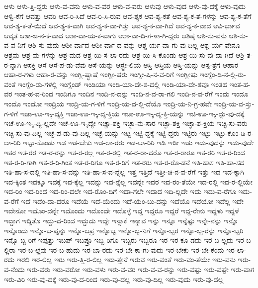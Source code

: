 {ಆಳು
ಆಳು-ತ್ತಿ-ದ್ದರು
ಆಳು-ವ-ವನು
ಆಳು-ವ-ವರ
ಆಳು-ವ-ವರು
ಆಳುವು
ಆಳು-ವುದ
ಆಳು-ವು-ದಕ್ಕೆ
ಆಳು-ವುದು
ಆಳ್ವಿ-ಕೆಗೆ
ಆವತ್ತು
ಆವರಿ
ಆವ-ರಿ-ಸಿದೆ
ಆವ-ರಿ-ಸಿ-ರುವ
ಆವ-ಶ್ಯಕ
ಆವ-ಶ್ಯ-ಕತೆ
ಆವ-ಶ್ಯ-ಕ-ತೆ-ಗಳನ್ನು
ಆವ-ಶ್ಯ-ಕ-ತೆಗೆ
ಆವ-ಶ್ಯ-ಕ-ತೆ-ಯಿದೆ
ಆವ-ಶ್ಯ-ಕ-ವಾಗಿ
ಆವ-ಶ್ಯ-ಕ-ವಾ-ಗಿತ್ತು
ಆವ-ಶ್ಯ-ಕ-ವಾ-ಗಿದೆ
ಆವ-ಶ್ಯ-ಕ-ವಾದ
ಆವಿ-ರ್ಭಾವ
ಆವೃತ
ಆಶಾ-ಜ-ನ-ಕ-ವಾದ
ಆಶಾ-ದಾ-ಯ-ಕ-ವಾಗು
ಆಶಾ-ವಾ-ದಿ-ಗ-ಳಾ-ಗಿ-ದ್ದರು
ಆಶಿಷ್ಠ
ಆಶಿ-ಸು-ವನು
ಆಶಿ-ಸು-ವ-ವ-ನಿಗೆ
ಆಶಿ-ಸು-ವುದು
ಆಶೀ-ರ್ವಾದ
ಆಶೀ-ರ್ವಾ-ದ-ವನ್ನು
ಆಶ್ಚ-ರ್ಯ-ವಾ-ಗು-ವು-ದಿಲ್ಲ
ಆಶ್ಚ-ರ್ಯ-ವೇನೂ
ಆಶ್ರಮ
ಆಶ್ರ-ಮ-ಗಳನ್ನು
ಆಶ್ರ-ಮದ
ಆಶ್ರ-ಯಿ-ಸ-ಲಾ-ರದು
ಆಶ್ರ-ಯಿ-ಸಿ-ಕೊಂಡು
ಆಶ್ರ-ಯಿ-ಸು-ವು-ದಾ-ಗಿದೆ
ಆಶ್ರಿ-ತ-ರ-ನ್ನಾಗಿ
ಆಸಕ್ತಿ
ಆಸೆ
ಆಸೆ-ಪ-ಡು-ವೆವು
ಆಸೆ-ಯನ್ನು
ಆಸ್ಟ್ರೇ-ಲಿಯ
ಆಸ್ತಿ
ಆಸ್ತಿಯ
ಆಸ್ತಿ-ಯನ್ನು
ಆಸ್ಪ-ತ್ರೆಗೆ
ಆಹಾರ
ಆಹಾ-ರ-ಗಳು
ಆಹಾ-ರ-ವನ್ನು
ಇಂಗ್ಲಿ-ಷ್ಭಾಷೆ
ಇಂಗ್ಲೀ-ಷರು
ಇಂಗ್ಲೀ-ಷಿ-ನ-ವ-ರಿಗೆ
ಇಂಗ್ಲೀಷು
ಇಂಗ್ಲೆಂ-ಡಿ-ನ-ಲ್ಲಿ-ರು-ವಂತೆ
ಇಂಗ್ಲೆಂ-ಡು-ಗಳಲ್ಲಿ
ಇಂಗ್ಲೆಂಡ್
ಇಂಡಿಯಾ
ಇಂಡಿ-ಯಾ-ದೇ-ಶ-ದಲ್ಲಿ
ಇಂಡಿ-ಯಾ-ದೇ-ಶವೂ
ಇಂತಹ
ಇಂತ-ಹ-ವರ
ಇಂತ-ಹ-ವ-ರಿಂದ
ಇಂದಿಗೂ
ಇಂದಿನ
ಇಂದಿ-ನ-ದನ್ನು
ಇಂದಿ-ನ-ವ-ರಾ-ಗಲಿ
ಇಂದಿ-ನ-ವ-ರೆಗೆ
ಇಂದು
ಇಂದೂ
ಇಂದೊ
ಇಂದೋ
ಇಂದ್ರಿಯ
ಇಂದ್ರಿ-ಯ-ಗ-ಳಿಗೆ
ಇಂದ್ರಿ-ಯ-ದ-ಲ್ಲಿ-ದೆಯೊ
ಇಂದ್ರಿ-ಯ-ನಿ-ಗ್ರ-ಹವೇ
ಇಂದ್ರಿ-ಯ-ವ-ಸ್ತು-ಗ-ಳಿಗೆ
ಇಚಾ-ಊ-ಇ-್ಕ-ದ್ಶಕ್ತಿ
ಇಚಾ-ಊ-ಇ-್ಕ-ದ್ಶ-ಕ್ತಿಯ
ಇಚಾ-ಊ-ಇ-್ಕ-ದ್ಶ-ಕ್ತಿ-ಯನ್ನು
ಇಚಿ-ಊ-ಇ-್ಕ-ದ್ಸು-ವು-ದಕ್ಕೆ
ಇಚೆ-ಊ-ಇ-್ಕ-ದ್ಯಿ-ಲ್ಲದೇ
ಇಚೆ-ಊ-ಇ-್ಕದ್ಯೇ
ಇಚ್ಚಾ-ಶಕ್ತಿ
ಇಚ್ಛಾ-ನು-ಸಾರ
ಇಚ್ಛಾ-ಶಕ್ತಿ
ಇಚ್ಛಾ-ಶ-ಕ್ತಿಯ
ಇಚ್ಛಿ-ಸು-ವರು
ಇಚ್ಛಿ-ಸು-ವು-ದಿಲ್ಲ
ಇಚ್ಛೆ-ಪ-ಡು-ವು-ದಿಲ್ಲ
ಇಚ್ಛೆ-ಯನ್ನು
ಇಟ್ಟ
ಇಟ್ಟಿ-ದ್ದಕ್ಕೆ
ಇಟ್ಟಿ-ದ್ದರು
ಇಟ್ಟಿರು
ಇಟ್ಟು
ಇಟ್ಟು-ಕೊಂ-ಡಿ-ರ-ಲಾ-ರಿರಿ
ಇಟ್ಟು-ಕೊಂಡು
ಇಡ
ಇಡ-ಬೇಕು
ಇಡ-ಲಾ-ರರು
ಇಡ-ಲಾ-ರಿರಿ
ಇಡಿ
ಇಡೀ
ಇಡು
ಇಡು-ವುದನ್ನು
ಇಡು-ವುದೇ
ಇತರ
ಇತ-ರರ
ಇತ-ರ-ರನ್ನು
ಇತ-ರ-ರಲ್ಲ
ಇತ-ರ-ರಲ್ಲಿ
ಇತ-ರ-ರಾ-ದರೊ
ಇತ-ರ-ರಾರೂ
ಇತ-ರರಿ
ಇತ-ರ-ರಿಂದ
ಇತ-ರ-ರಿ-ಗಾಗಿ
ಇತ-ರ-ರಿ-ಗಿಂತ
ಇತ-ರ-ರಿಗೂ
ಇತ-ರ-ರಿಗೆ
ಇತ-ರರು
ಇತ-ರ-ರೊ-ಡನೆ
ಇತಿ-ಹಾಸ
ಇತಿ-ಹಾ-ಸದ
ಇತಿ-ಹಾ-ಸ-ದಲ್ಲಿ
ಇತಿ-ಹಾ-ಸ-ವನ್ನು
ಇತಿ-ಹಾ-ಸ-ವ-ನ್ನೆಲ್ಲ
ಇತ್ತ
ಇತ್ತಿದೆ
ಇತ್ತೀ-ಚಿ-ನ-ವ-ರೆಗೆ
ಇತ್ತು
ಇದ
ಇದ-ಕ್ಕಾಗಿ
ಇದ-ಕ್ಕಿಂತ
ಇದಕ್ಕೂ
ಇದಕ್ಕೆ
ಇದ-ಕ್ಕೆಲ್ಲ
ಇದನ್ನು
ಇದ-ನ್ನೆಲ್ಲ
ಇದನ್ನೇ
ಇದರ
ಇದ-ರಂ-ತೆಯೇ
ಇದ-ರಲ್ಲಿ
ಇದ-ರ-ಲ್ಲಿಯೇ
ಇದ-ರಿಂ
ಇದ-ರಿಂದ
ಇದ-ರಿಂ-ದಲೇ
ಇದ-ರೊಂ-ದಿಗೆ
ಇದಾ-ಗಲೇ
ಇದಾದ
ಇದಿ-ಲ್ಲದೇ
ಇದು
ಇದು-ವ-ರೆಗೂ
ಇದು-ವ-ರೆಗೆ
ಇದೆ
ಇದೆಂ-ದಾ-ದರೂ
ಇದೆಯೆ
ಇದೆ-ಯೆಂದು
ಇದೆ-ಯೆಂ-ಬು-ದನ್ನು
ಇದೆಯೊ
ಇದೆಯೋ
ಇದೆಲ್ಲ
ಇದೇ
ಇದೇನೋ
ಇದೊಂ-ದನ್ನೇ
ಇದೊಂದು
ಇದೊಂದೇ
ಇದೊಳ್ಳೆ
ಇದ್ದ
ಇದ್ದರೂ
ಇದ್ದರೆ
ಇದ್ದ-ರೇನು
ಇದ್ದಳು
ಇದ್ದಳೆ
ಇದ್ದಾಗ
ಇದ್ದಿತೊ
ಇದ್ದು-ದ-ರಿಂದ
ಇದ್ದುದು
ಇದ್ದೇ
ಇನ್ನಾಕೆ
ಇನ್ನಾವ
ಇನ್ನು
ಇನ್ನೂ
ಇನ್ನೆಷ್ಟು
ಇನ್ನೇ-ನನ್ನು
ಇನ್ನೊ
ಇನ್ನೊಂದು
ಇನ್ನೊ-ಬ-ಪ್ನನ್ನು
ಇನ್ನೊ-ಬಪ್ರ
ಇನ್ನೊಬ್ಬ
ಇನ್ನೊ-ಬ್ಬ-ನಿಗೆ
ಇನ್ನೊ-ಬ್ಬರ
ಇನ್ನೊ-ಬ್ಬ-ರನ್ನು
ಇನ್ನೊ-ಬ್ಬರಿ
ಇನ್ನೊ-ಬ್ಬ-ರಿಗೆ
ಇಪ್ಪತ್ತು
ಇಬಪ್
ಇಬಪ್ರೂ
ಇಬ್ಬ-ರಿಗೂ
ಇಬ್ಬರು
ಇಬ್ಬರೂ
ಇರ
ಇರ-ಕೂ-ಡದು
ಇರ-ಬ-ಲ್ಲದು
ಇರ-ಬ-ಲ್ಲಿರಾ
ಇರ-ಬ-ಲ್ಲೆವು
ಇರ-ಬ-ಹುದು
ಇರ-ಬಾ-ರದು
ಇರ-ಬೇ-ಕಾ-ಗು-ವುದು
ಇರ-ಬೇಕು
ಇರ-ಬೇ-ಕೆಂದು
ಇರ-ಲಾ-ರದು
ಇರಲಿ
ಇರ-ಲಿಲ್ಲ
ಇರು
ಇರು-ತ್ತಿ-ರ-ಲಿಲ್ಲ
ಇರು-ತ್ತೇನೆ
ಇರುವ
ಇರು-ವಂತೆ
ಇರು-ವಂ-ತೆಯೇ
ಇರು-ವನು
ಇರು-ವ-ನೆಂದು
ಇರು-ವರು
ಇರು-ವರೋ
ಇರು-ವಳು
ಇರು-ವ-ವರ
ಇರು-ವ-ವ-ರನ್ನು
ಇರು-ವಷ್ಟು
ಇರು-ವಷ್ಟೇ
ಇರು-ವಾಗ
ಇರು-ವಿರಿ
ಇರು-ವು-ದಕ್ಕೆ
ಇರು-ವು-ದ-ರಿಂದ
ಇರು-ವು-ದಲ್ಲ
ಇರು-ವು-ದಿಲ್ಲ
ಇರು-ವುದು
ಇರು-ವು-ದೆಲ್ಲ
}
